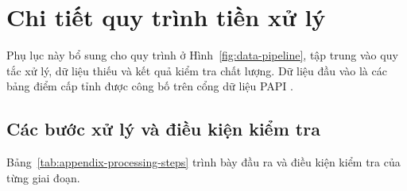 \section{Chi tiết quy trình tiền xử lý}
\label{appendix:preprocessing}

Phụ lục này bổ sung cho quy trình ở Hình~\ref{fig:data-pipeline}, tập trung vào quy tắc xử lý, dữ liệu thiếu và kết quả kiểm tra chất lượng. Dữ liệu đầu vào là các bảng điểm cấp tỉnh được công bố trên cổng dữ liệu PAPI \cite{papiDataPortal}.

\subsection{Các bước xử lý và điều kiện kiểm tra}

Bảng~\ref{tab:appendix-processing-steps} trình bày đầu ra và điều kiện kiểm tra của từng giai đoạn.

